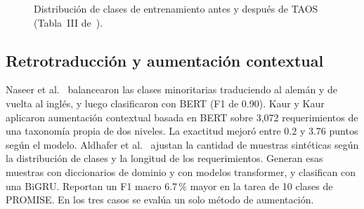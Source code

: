 \documentclass[conference]{IEEEtran}
\begin{document}
\begin{figure}[!t]
\centering
{}
\caption{Distribución de clases de entrenamiento antes y después de TAOS (Tabla~III de~\cite{BenAmmar2025-TAOS}).}
\label{fig:dist}
\end{figure}

\subsection{Retrotraducción y aumentación contextual}
Naseer et al.~\cite{Naseer2026-Fused} balancearon las clases minoritarias traduciendo al alemán y de vuelta al inglés, y luego clasificaron con BERT (F1 de 0.90). Kaur y Kaur~\cite{Kaur2026-Hybrid} aplicaron aumentación contextual basada en BERT sobre 3,072 requerimientos de una taxonomía propia de dos niveles. La exactitud mejoró entre 0.2 y 3.76 puntos según el modelo. Aldhafer et al.~\cite{Aldhafer2026-Adaptive} ajustan la cantidad de muestras sintéticas según la distribución de clases y la longitud de los requerimientos. Generan esas muestras con diccionarios de dominio y con modelos transformer, y clasifican con una BiGRU. Reportan un F1 macro 6.7\,\% mayor en la tarea de 10 clases de PROMISE. En los tres casos se evalúa un solo método de aumentación.
\end{document}
